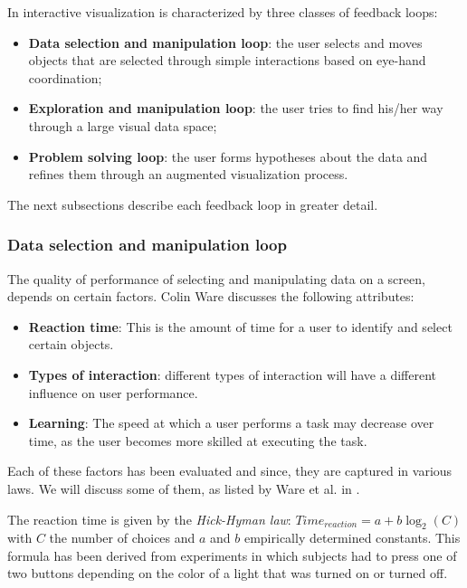 In \cite{ware:2004} interactive visualization is characterized by three classes of feedback loops:

\begin{itemize}
	\item \textbf{Data selection and manipulation loop}: the user selects and moves objects that are selected through simple interactions based on eye-hand coordination;
	\item \textbf{Exploration and manipulation loop}: the user tries to find his/her way through a large visual data space;
	\item \textbf{Problem solving loop}: the user forms hypotheses about the data and refines them through an augmented visualization process.
\end{itemize}

The next subsections describe each feedback loop in greater detail.


\subsubsection{Data selection and manipulation loop}\label{chapter:literature_study:section:user:subsection:interactive:subsubsection:loops1}

The quality of performance of selecting and manipulating data on a screen, depends on certain factors. Colin Ware discusses the following attributes:

\begin{itemize}
	\item \textbf{Reaction time}: This is the amount of time for a user to identify and select certain objects\cite{ware:2004}.
	\item \textbf{Types of interaction}: different types of interaction will have a different influence on user performance.
	\item \textbf{Learning}: The speed at which a user performs a task may decrease over time, as the user becomes more skilled at executing the task.
\end{itemize}

Each of these factors has been evaluated and since, they are captured in various laws. We will discuss some of them, as listed by Ware et al. in \cite{ware:2004}.

The reaction time is given by the \emph{Hick-Hyman law}: $Time_{reaction} = a + b \log_{2}(C)$ with $C$ the number of choices and $a$ and $b$ empirically determined constants. This formula has been derived from experiments in which subjects had to press one of two buttons depending on the color of a light that was turned on or turned off\cite{ware:2004}.


